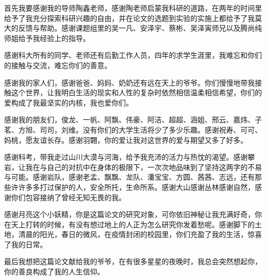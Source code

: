 
\begin{acknowledgements}

首先我要感谢我的导师陶鑫老师，感谢陶老师启蒙我科研的道路，在两年的时间里给予了我充分探索科研兴趣的自由，并在论文的选题到实验的实施上都给予了我莫大的反馈与帮助。感谢课题组里的吴一凡、安泽宇、蔡彬、吴泽寅师兄以及腾尚纯师姐给予我经验上的指导。

感谢科大所有的同学、老师还有后勤工作人员，四年的求学生涯里，我难忘和你们的接触与交流，难忘你们的善意。

感谢我的家人们，感谢爸爸、妈妈、奶奶还有远在天上的爷爷。你们慢慢地带我接触这个世界，让我明白生活的现实和人性的复杂时依然相信温柔相信希望，你们的爱构成了我最坚实的内核，我也爱你们。

感谢我的朋友们，俊龙、一帆、阿飘、伟豪、阿洁、超超、涵姐、邢云、嘉炜、子茗、方旭、司司，刘维。没有你们的大学生活将少了多少乐趣。感谢祝寿、可可、妈桃，愿友谊长存。感谢羽翾，你的爱让我对这世界的爱与期望又多了好多。

感谢科考，带我走过山川大漠与河海，给予我充沛的活力与热忱的渴望。感谢攀岩，让我在与自己的对抗中在身体的极限下，一次次地品味到了坚持这两字的不易与可能。感谢岩队，感谢老孟、飘飘、龙队、潘宝宝、方圆、茜茜、志远，还有那些许许多多打过保护的人，安全所托，生命所系。感谢大山感谢丛林感谢自然，感谢你们包容接纳了曾经无知无畏的我。

感谢月亮这个小妖精，你是这篇论文的研究对象，可你依旧神秘让我充满好奇，你在天上打转的时候，有没有想过地上的人正为怎么研究你发着愁呢。感谢脚下的土地，清晨的阳光，春日的微风，在疫情封闭的校园里，你们充盈了我的生活，惊喜了我的日常。

最后我想把这篇论文献给我的爷爷，在有很多星星的夜晚时，我总会突然想起你，你的善良构成了我的人生信仰。

    


\end{acknowledgements}
